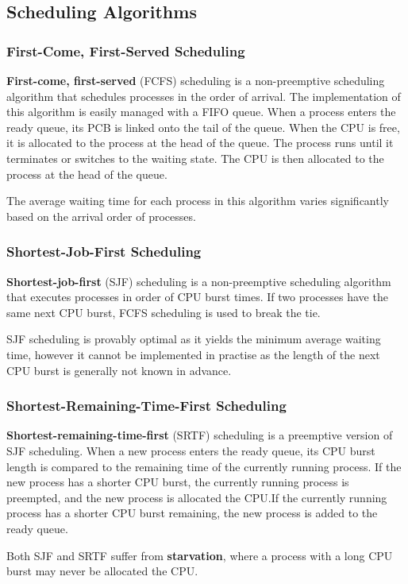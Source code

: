 \documentclass{article}
\begin{document}
\subsection{Scheduling Algorithms}
\subsubsection{First-Come, First-Served Scheduling}
\textbf{First-come, first-served} (FCFS) scheduling is a non-preemptive
scheduling algorithm that \linebreak schedules processes in the order of arrival.
The implementation of this algorithm is easily managed with a FIFO
queue. When a process enters the ready queue, its PCB is linked onto
the tail of the queue. When the CPU is free, it is allocated to the
process at the head of the queue. The process runs until it terminates
or switches to the waiting state. The CPU is then allocated to the
process at the head of the queue.

The average waiting time for each process in this algorithm varies
significantly based on the arrival order of processes.
\subsubsection{Shortest-Job-First Scheduling}
\textbf{Shortest-job-first} (SJF) scheduling is a non-preemptive
scheduling algorithm that executes processes in order of CPU burst
times. If two processes have the same next CPU burst, FCFS scheduling is
used to break the tie.

SJF scheduling is provably optimal as it yields the minimum average
waiting time, however it cannot be implemented in practise as the
length of the next CPU burst is generally not known in advance.
\subsubsection{Shortest-Remaining-Time-First Scheduling}
\textbf{Shortest-remaining-time-first} (SRTF) scheduling is a preemptive
version of SJF scheduling. When a new process enters the ready queue,
its CPU burst length is compared to the remaining time of the currently
running process. If the new process has a shorter CPU burst, the
currently running process is preempted, and the new process is
allocated the CPU.\@ If the currently running process has a shorter CPU
burst remaining, the new process is added to the ready queue.

Both SJF and SRTF suffer from \textbf{starvation}, where a process with
a long CPU burst may never be allocated the CPU.\@
\end{document}
